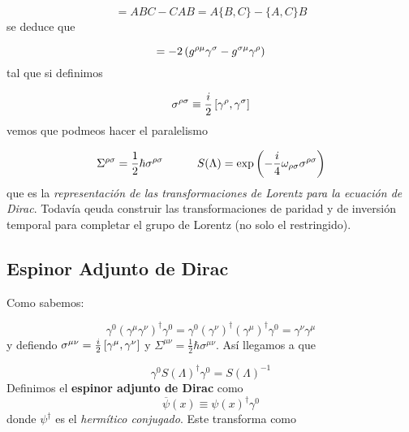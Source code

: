 \begin{equation}
	[AB,C] = ABC-CAB = A\{B,C\}-\{A,C\}B
\end{equation}
se deduce que

\begin{equation}
	[\gamma^{\rho}\gamma^{\sigma},\gamma^\mu] = -2\parentesis{g^{\rho \mu} \gamma^{\sigma}-g^{\sigma \mu}\gamma^{\rho}}
\end{equation}
tal que si definimos

\begin{equation}
	\sigma^{\rho \sigma} \equiv \frac{i}{2}\left[ \gamma^\rho,\gamma^\sigma \right]
\end{equation}
vemos que podmeos hacer el paralelismo

\begin{equation}
	\Sigma^{\rho \sigma} = \frac{1}{2} \hbar \sigma^{\rho \sigma} \quad \quad \quad S(\Lambda)=\exp\left( -\frac{i}{4}\omega_{\rho \sigma}\sigma^{\rho \sigma} \right)
\end{equation}
que es la \textit{representación de las transformaciones de Lorentz para la ecuación de Dirac}. Todavía qeuda construir las transformaciones de paridad y de inversión temporal para completar el grupo de Lorentz (no solo el restringido).


\subsection{Espinor Adjunto de Dirac}

Como sabemos:

\begin{equation}
	\gamma^{0}(\gamma^\mu \gamma^\nu)^\dagger \gamma^0 = \gamma^0 (\gamma^\nu)^\dagger (\gamma^\mu)^\dagger \gamma^0 = \gamma^\nu \gamma^\mu
\end{equation}
y defiendo $\sigma^{\mu \nu}=\frac{i}{2} \left[ \gamma^\mu,\gamma^\nu \right]$ y $\Sigma^{\mu \nu}=\frac{1}{2} \hbar \sigma^{\mu \nu}$. Así llegamos a que

\begin{equation}
	\gamma^0 S(\Lambda)^\dagger \gamma^0 = S(\Lambda)^{-1}
\end{equation}
Definimos el \textbf{espinor adjunto de Dirac} como
\begin{equation}
	\overline{\psi} (x) \equiv \psi(x)^\dagger\gamma^0
\end{equation}
donde $\psi^\dagger$ es el \textit{hermítico conjugado}. Este transforma como

